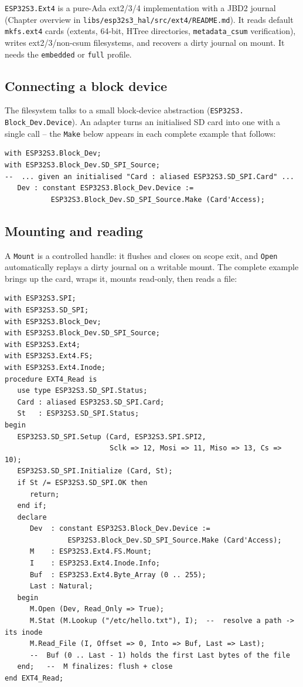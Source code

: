 \texttt{ESP32S3.Ext4} is a pure-Ada ext2/3/4 implementation with a JBD2 journal
(Chapter overview in \texttt{libs/esp32s3\_hal/src/ext4/README.md}). It reads
default \texttt{mkfs.ext4} cards (extents, 64-bit, HTree directories,
\texttt{metadata\_csum} verification), writes ext2/3/non-csum filesystems, and
recovers a dirty journal on mount. It needs the \texttt{embedded} or \texttt{full}
profile.

\subsection{Connecting a block device}

The filesystem talks to a small block-device abstraction (\texttt{ESP32S3.%
Block\_Dev.Device}). An adapter turns an initialised SD card into one with a
single call -- the \texttt{Make} below appears in each complete example that
follows:

\begin{lstlisting}
with ESP32S3.Block_Dev;
with ESP32S3.Block_Dev.SD_SPI_Source;
--  ... given an initialised "Card : aliased ESP32S3.SD_SPI.Card" ...
   Dev : constant ESP32S3.Block_Dev.Device :=
           ESP32S3.Block_Dev.SD_SPI_Source.Make (Card'Access);
\end{lstlisting}

\subsection{Mounting and reading}

A \texttt{Mount} is a controlled handle: it flushes and closes on scope exit, and
\texttt{Open} automatically replays a dirty journal on a writable mount. The
complete example brings up the card, wraps it, mounts read-only, then reads a
file:

\begin{lstlisting}
with ESP32S3.SPI;
with ESP32S3.SD_SPI;
with ESP32S3.Block_Dev;
with ESP32S3.Block_Dev.SD_SPI_Source;
with ESP32S3.Ext4;
with ESP32S3.Ext4.FS;
with ESP32S3.Ext4.Inode;
procedure EXT4_Read is
   use type ESP32S3.SD_SPI.Status;
   Card : aliased ESP32S3.SD_SPI.Card;
   St   : ESP32S3.SD_SPI.Status;
begin
   ESP32S3.SD_SPI.Setup (Card, ESP32S3.SPI.SPI2,
                         Sclk => 12, Mosi => 11, Miso => 13, Cs => 10);
   ESP32S3.SD_SPI.Initialize (Card, St);
   if St /= ESP32S3.SD_SPI.OK then
      return;
   end if;
   declare
      Dev  : constant ESP32S3.Block_Dev.Device :=
               ESP32S3.Block_Dev.SD_SPI_Source.Make (Card'Access);
      M    : ESP32S3.Ext4.FS.Mount;
      I    : ESP32S3.Ext4.Inode.Info;
      Buf  : ESP32S3.Ext4.Byte_Array (0 .. 255);
      Last : Natural;
   begin
      M.Open (Dev, Read_Only => True);
      M.Stat (M.Lookup ("/etc/hello.txt"), I);  --  resolve a path -> its inode
      M.Read_File (I, Offset => 0, Into => Buf, Last => Last);
      --  Buf (0 .. Last - 1) holds the first Last bytes of the file
   end;   --  M finalizes: flush + close
end EXT4_Read;
\end{lstlisting}

